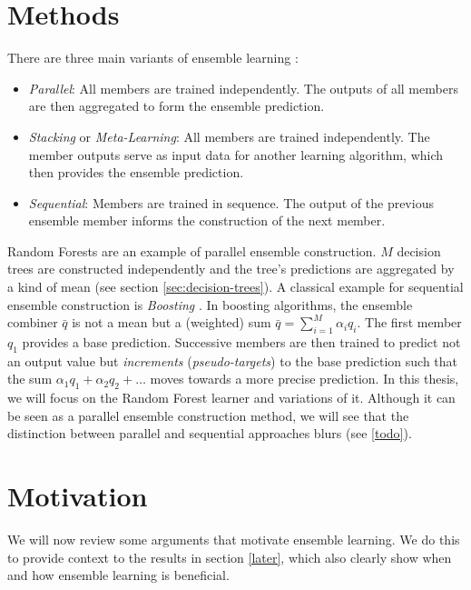 \documentclass[
    a4paper, %
	fontsize=10pt, %
	twoside=false, %
]{kaobook}
\begin{document}
\section{Methods}
\label{sec:ensemble-learning-methods}
There are three main variants of ensemble learning \cite{mienye_SurveyEnsembleLearning_2022}:
\begin{itemize}
\item \textit{Parallel}: All members are trained independently. The outputs of all members are then aggregated to form the ensemble prediction.
\item \textit{Stacking} or \textit{Meta-Learning}: All members are trained independently. The member outputs serve as input data for another learning algorithm, which then provides the ensemble prediction.
\item \textit{Sequential}: Members are trained in sequence. The output of the previous ensemble member informs the construction of the next member.
\end{itemize}
Random Forests \cite{breiman_RandomForests_2001} are an example of parallel ensemble construction. $M$ decision trees are constructed independently and the tree's predictions are aggregated by a kind of mean (see section \ref{sec:decision-trees}). A classical example for sequential ensemble construction is \textit{Boosting} \cite{schapire_BoostingFoundationsAlgorithms_2012}. In boosting algorithms, the ensemble combiner $\bar{q}$ is not a mean but a (weighted) sum $\bar{q} = \sum_{i=1}^M \alpha_{i}q_{i}$. The first member $q_{1}$ provides a base prediction. Successive members are then trained to predict not an output value but \textit{increments} (\textit{pseudo-targets}) to the base prediction such that the sum $\alpha_{1}q_{1} + \alpha_{2}q_{2} + \dots$ moves towards a more precise prediction. 
In this thesis, we will focus on the Random Forest learner and variations of it. Although it can be seen as a parallel ensemble construction method, we will see that the distinction between parallel and sequential approaches blurs (see \ref{todo}).

\section{Motivation}
\label{sec:ensemble-learning-motivation}

We will now review some arguments that motivate ensemble learning. We do this to provide context to the results in section \ref{later}, which also clearly show when and how ensemble learning is beneficial.
\end{document}
